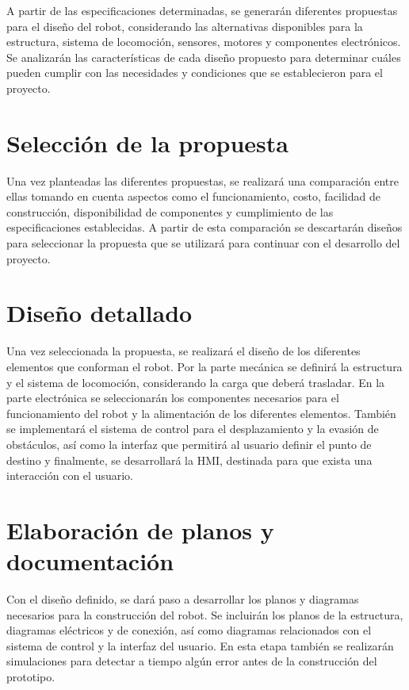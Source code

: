 A partir de las especificaciones determinadas, se generarán diferentes propuestas para el diseño del robot, considerando las alternativas disponibles para la estructura, sistema de locomoción, sensores, motores y componentes electrónicos. Se analizarán las características de cada diseño propuesto para determinar cuáles pueden cumplir con las necesidades y condiciones que se establecieron para el proyecto.

\section{Selección de la propuesta}
\label{sec:propuesta}

Una vez planteadas las diferentes propuestas, se realizará una comparación entre ellas tomando en cuenta aspectos como el funcionamiento, costo, facilidad de construcción, disponibilidad de componentes y cumplimiento de las especificaciones establecidas. A partir de esta comparación se descartarán diseños para seleccionar la propuesta que se utilizará para continuar con el desarrollo del proyecto.

\section{Diseño detallado}
\label{sec:diseño_detallado}
Una vez seleccionada la propuesta, se realizará el diseño de los diferentes elementos que conforman el robot. Por la parte mecánica se definirá la estructura y el sistema de locomoción, considerando la carga que deberá trasladar. En la parte electrónica se seleccionarán los componentes necesarios para el funcionamiento del robot y la alimentación de los diferentes elementos. También se  implementará el sistema de control para el desplazamiento y la evasión de obstáculos, así como la interfaz que permitirá al usuario definir el punto de destino y finalmente, se desarrollará la HMI, destinada para que exista una interacción con el usuario.

\section{Elaboración de planos y documentación}
\label{sec:Planos_documentacion}
Con el diseño definido, se dará paso a desarrollar los planos y diagramas necesarios para la construcción del robot. Se incluirán los planos de la estructura, diagramas eléctricos y de conexión, así como diagramas relacionados con el sistema de control y la interfaz del usuario. En esta etapa también se realizarán simulaciones para detectar a tiempo algún error antes de la construcción del prototipo.

